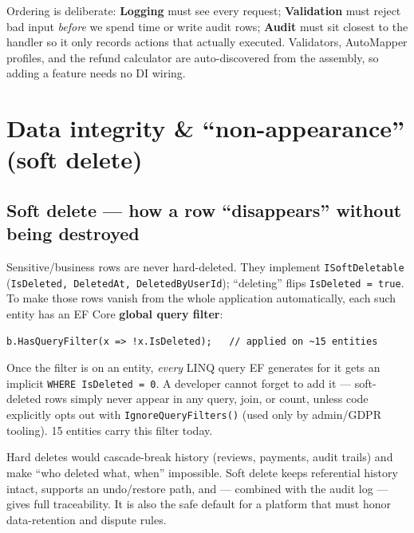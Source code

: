 \documentclass[11pt,a4paper]{article}
\newcommand{\code}[1]{\texttt{\textcolor{spInk}{#1}}}
\begin{document}
\begin{whybox}
Ordering is deliberate: \textbf{Logging} must see every request; \textbf{Validation}
must reject bad input \emph{before} we spend time or write audit rows;
\textbf{Audit} must sit closest to the handler so it only records actions that
actually executed. Validators, AutoMapper profiles, and the refund calculator are
auto-discovered from the assembly, so adding a feature needs no DI wiring.
\end{whybox}

\section{Data integrity \& ``non-appearance'' (soft delete)}

\subsection{Soft delete --- how a row ``disappears'' without being destroyed}
Sensitive/business rows are never hard-deleted. They implement
\code{ISoftDeletable} (\code{IsDeleted, DeletedAt, DeletedByUserId}); ``deleting''
flips \code{IsDeleted = true}. To make those rows vanish from the whole
application automatically, each such entity has an EF Core \textbf{global query
filter}:

\begin{lstlisting}
b.HasQueryFilter(x => !x.IsDeleted);   // applied on ~15 entities
\end{lstlisting}

\begin{howbox}
Once the filter is on an entity, \emph{every} LINQ query EF generates for it gets
an implicit \code{WHERE IsDeleted = 0}. A developer cannot forget to add it ---
soft-deleted rows simply never appear in any query, join, or count, unless code
explicitly opts out with \code{IgnoreQueryFilters()} (used only by admin/GDPR
tooling). 15 entities carry this filter today.
\end{howbox}

\begin{whybox}
Hard deletes would cascade-break history (reviews, payments, audit trails) and
make ``who deleted what, when'' impossible. Soft delete keeps referential history
intact, supports an undo/restore path, and --- combined with the audit log ---
gives full traceability. It is also the safe default for a platform that must
honor data-retention and dispute rules.
\end{whybox}
\end{document}
